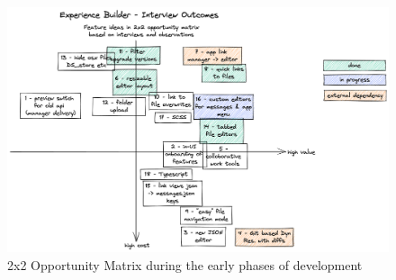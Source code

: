 \begin{figure}[ht]
	\centering
  \includegraphics[width=\textwidth]{pics/feature_cost_matrix.excalidraw.png}
	\caption{2x2 Opportunity Matrix during the early phases of development}
	\label{fig:opportunitymatrix}
\end{figure}
